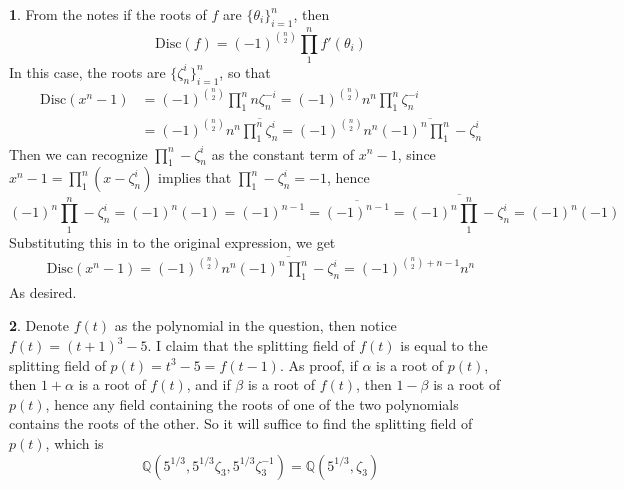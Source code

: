 \documentclass[11pt]{article}
\theoremstyle{definition}
\newtheorem{pb}{}
\newcommand{\set}[1]{\{#1\}}
\begin{document}
    \begin{pb}
        From the notes if the roots of \(f\) are \(\set{\theta_i}_{i=1}^n\), then \[\text{Disc}(f) = (-1)^{\binom{n}{2}}\prod_1^n f'(\theta_i)\]
        In this case, the roots are \(\set{\zeta_n^i}_{i=1}^n\), so that
        \begin{align*}
            \text{Disc}(x^n-1) &= (-1)^{\binom{n}{2}}\prod_1^n n\zeta^{-i}_n = (-1)^{\binom{n}{2}}n^n\prod_1^n \zeta^{-i}_n \\
            &= (-1)^{\binom{n}{2}}n^n \overline{\prod_1^n \zeta^{i}_n} = (-1)^{\binom{n}{2}}n^n \overline{(-1)^n \prod_1^n -\zeta^{i}_n}
        \end{align*}
        Then we can recognize \(\prod_1^n -\zeta^{i}_n\) as the constant term of \(x^n -1\), since \(x^n - 1 = \prod_1^n(x-\zeta_n^i)\) implies that
        \(\prod_1^n -\zeta_n^i = -1\), hence \[(-1)^n\prod_1^n -\zeta^{i}_n = (-1)^n(-1) = (-1)^{n-1} = \overline{(-1)^{n-1}} = \overline{(-1)^n\prod_1^n -\zeta^{i}_n} = (-1)^n(-1)\]
        Substituting this in to the original expression, we get
        \begin{align*}
            \text{Disc}(x^n-1) = (-1)^{\binom{n}{2}}n^n \overline{(-1)^n \prod_1^n -\zeta^{i}_n} = (-1)^{\binom{n}{2} + n - 1}n^n
        \end{align*}
        As desired.
    \end{pb}
    \begin{pb}
        Denote \(f(t)\) as the polynomial in the question, then notice \(f(t) = (t+1)^3 - 5\). I claim that the splitting field of \(f(t)\) is equal to the splitting field of \(p(t) = t^3 - 5 = f(t-1)\). 
        As proof, if \(\alpha\) is a root of \(p(t)\), then \(1 + \alpha\) is a root of \(f(t)\), and if \(\beta\) is a root of \(f(t)\), then \(1-\beta\) is a root of \(p(t)\), hence any field containing the roots of
        one of the two polynomials contains the roots of the other. So it will suffice to find the splitting field of \(p(t)\), which is 
        \[\mathbb{Q}(5^{1/3},5^{1/3}\zeta_3,5^{1/3}\zeta_3^{-1}) = \mathbb{Q}(5^{1/3},\zeta_3)\]
    \end{pb}
\end{document}
